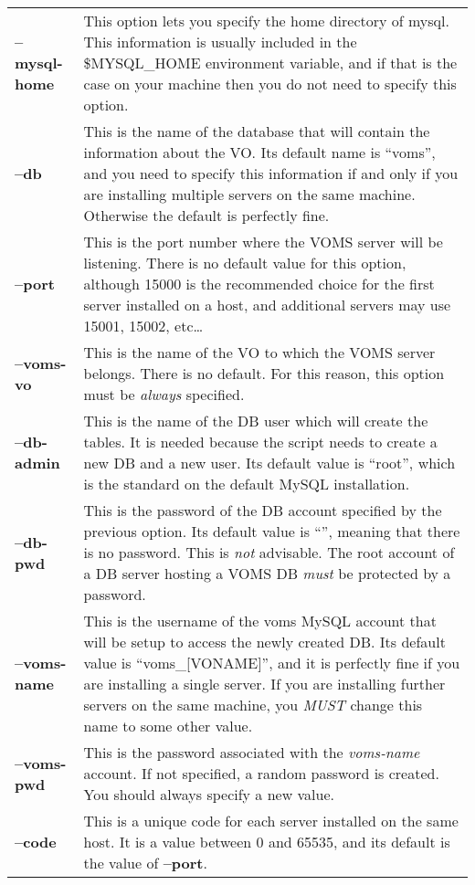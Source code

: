 \documentclass[a4paper]{book}
\begin{document}
\begin{longtable}{lp{3in}}
\textbf{--mysql-home} & This option lets you specify the home
directory of mysql.  This information is usually included in the
\$MYSQL\_HOME environment variable, and if that is the case on your
machine then you do not need to specify this option.\\
\textbf{--db} & This is the name of the database that will contain
the information about the VO.  Its default name is ``voms'', and you
need to specify this information if and only if you are installing
multiple servers on the same machine.  Otherwise the default is
perfectly fine.\\
\textbf{--port} & This is the port number where the VOMS server will
be listening.  There is no default value for this option, although
15000 is the recommended choice for the first server installed on a
host, and additional servers may use 15001, 15002, etc\ldots\\
\textbf{--voms-vo} & This is the name of the VO to which the VOMS
server belongs.  There is no default. For this reason, this option
must be \emph{always} specified.\\
\textbf{--db-admin} & This is the name of the DB user which will create 
the tables.  It is needed because the script needs to create a new DB 
and a new user. Its default value is ``root'', which is the standard 
on the default MySQL installation.\\
\textbf{--db-pwd} & This is the password of the DB account
specified by the previous option.  Its default value is ``'', meaning
that there is no password.  This is \emph{not} advisable.  The root
account of a DB server hosting a VOMS DB \emph{must} be protected
by a password.\\
\textbf{--voms-name} & This is the username of the voms MySQL account
that will be setup to access the newly created DB.  Its default value
is ``voms\_[VONAME]'', and it is perfectly fine if you are installing a single
server.  If you are installing further servers on the same machine, you
\emph{MUST} change this name to some other value.\\
\textbf{--voms-pwd} & This is the password associated with the
\emph{voms-name} account.  If not specified, a random password is created.  
You should always specify a new value.\\
\textbf{--code} & This is a unique code for each server installed on the
same host. It is a value between 0 and 65535, and its default is the
value of \textbf{--port}.\\

\end{longtable}
\end{document}
